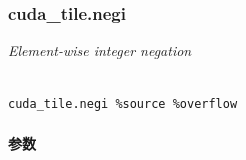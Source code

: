 \documentclass{article}
\begin{document}
\subsubsection{cuda\_tile.negi}


\textit{Element-wise integer negation}




\begin{lstlisting}

cuda_tile.negi %source %overflow

\end{lstlisting}



\paragraph{参数}
\end{document}
